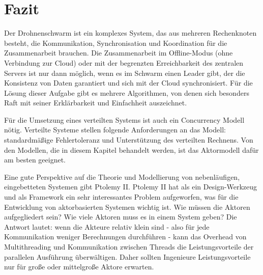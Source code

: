 \section{Fazit}

Der Drohnenschwarm ist ein komplexes System, das aus mehreren Rechenknoten besteht, die Kommunikation, Synchronisation und Koordination für die Zusammenarbeit brauchen. Die Zusammenarbeit im Offline-Modus (ohne Verbindung zur Cloud) oder mit der begrenzten Erreichbarkeit des zentralen Servers ist nur dann möglich, wenn es im Schwarm einen Leader gibt, der die Konsistenz von Daten garantiert und sich mit der Cloud synchronisiert. Für die Lösung dieser Aufgabe gibt es mehrere Algorithmen, von denen sich besonders Raft mit seiner Erklärbarkeit und Einfachheit auszeichnet.

Für die Umsetzung eines verteilten Systems ist auch ein Concurrency Modell nötig. Verteilte Systeme stellen folgende Anforderungen an das Modell: standardmäßige Fehlertoleranz und Unterstützung des verteilten Rechnens. Von den Modellen, die in diesem Kapitel behandelt werden, ist das Aktormodell dafür am besten geeignet.

Eine gute Perspektive auf die Theorie und Modellierung von nebenläufigen, eingebetteten Systemen gibt Ptolemy II. Ptolemy II hat als ein Design-Werkzeug und als Framework ein sehr interessantes Problem aufgeworfen, was für die Entwicklung von aktorbasierten Systemen wichtig ist. Wie müssen die Aktoren aufgegliedert sein? Wie viele Aktoren muss es in einem System geben? Die Antwort lautet: wenn die Akteure relativ klein sind - also für jede Kommunikation weniger Berechnungen durchführen - kann das Overhead von Multithreading und Kommunikation zwischen Threads die Leistungsvorteile der parallelen Ausführung überwältigen. Daher sollten Ingenieure Leistungsvorteile nur für große oder mittelgroße Aktore erwarten.
